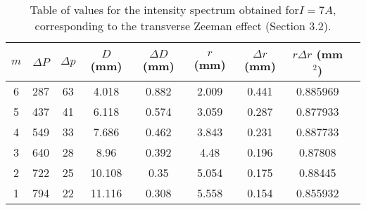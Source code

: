 \documentclass[11pt,twocolumn, a4paper]{article}
\numberwithin{equation}{section} %
\numberwithin{figure}{section} %
\numberwithin{table}{section} %
\begin{document}
\begin{table}[H]
    \centering
    \caption{Table of values for the intensity spectrum obtained for\(I=7A\), corresponding to the transverse Zeeman effect (Section 3.2).}
    \begin{tabular}{c c c c c c c c c}
        \hline
        \(m\) & \(\Delta P\) & \(\Delta p\) & \(D\) (mm) & \(\Delta D\) (mm) & \(r\) (mm) & \(\Delta r\) (mm) & \(r\Delta r\) (mm\(^2\)) \\
        \hline
        6 & 287 & 63 & 4.018  & 0.882 & 2.009 & 0.441 & 0.885969 \\
        5 & 437 & 41 & 6.118  & 0.574 & 3.059 & 0.287 & 0.877933 \\
        4 & 549 & 33 & 7.686  & 0.462 & 3.843 & 0.231 & 0.887733 \\
        3 & 640 & 28 & 8.96   & 0.392 & 4.48  & 0.196 & 0.87808  \\
        2 & 722 & 25 & 10.108 & 0.35  & 5.054 & 0.175 & 0.88445  \\
        1 & 794 & 22 & 11.116 & 0.308 & 5.558 & 0.154 & 0.855932 \\
        \hline
    \end{tabular}
\end{table}
\end{document}
